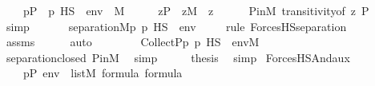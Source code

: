 \begin{isabellebody}
\ \ \ \ {\isachardoublequoteopen}{\isacharbraceleft}{\kern0pt}p{\isasymin}P\ {\isachardot}{\kern0pt}\ p\ {\isasymtturnstile}HS\ {\isasymphi}\ env{\isacharbraceright}{\kern0pt}\ {\isasymin}\ M{\isachardoublequoteclose}\isanewline
%
\isadelimproof
%
\endisadelimproof
%
\isatagproof
{}\isamarkupfalse%
\ {\isacharminus}{\kern0pt}\isanewline
\ \ \isamarkupfalse%
\ {\isachardoublequoteopen}z{\isasymin}P\ {\isasymLongrightarrow}\ z{\isasymin}M{\isachardoublequoteclose}\ \ z\isanewline
\ \ \ \ \isamarkupfalse%
\ P{\isacharunderscore}{\kern0pt}in{\isacharunderscore}{\kern0pt}M\ transitivity{\isacharbrackleft}{\kern0pt}of\ z\ P{\isacharbrackright}{\kern0pt}\ \isamarkupfalse%
\ simp\isanewline
\ \ \isamarkupfalse%
\isanewline
\ \ \isamarkupfalse%
\ {\isachardoublequoteopen}separation{\isacharparenleft}{\kern0pt}{\isacharhash}{\kern0pt}{\isacharhash}{\kern0pt}M{\isacharcomma}{\kern0pt}{\isasymlambda}p{\isachardot}{\kern0pt}\ {\isacharparenleft}{\kern0pt}p\ {\isasymtturnstile}HS\ {\isasymphi}\ env{\isacharparenright}{\kern0pt}{\isacharparenright}{\kern0pt}{\isachardoublequoteclose}\isanewline
\ \ \ \ \isamarkupfalse%
{\isacharparenleft}{\kern0pt}rule\ ForcesHS{\isacharunderscore}{\kern0pt}separation{\isacharparenright}{\kern0pt}\isanewline
\ \ \ \ \isamarkupfalse%
\ assms\isanewline
\ \ \ \ \isamarkupfalse%
\ auto\isanewline
\ \ \isamarkupfalse%
\ \isanewline
\ \ \isamarkupfalse%
\ {\isachardoublequoteopen}Collect{\isacharparenleft}{\kern0pt}P{\isacharcomma}{\kern0pt}{\isasymlambda}p{\isachardot}{\kern0pt}\ {\isacharparenleft}{\kern0pt}p\ {\isasymtturnstile}HS\ {\isasymphi}\ env{\isacharparenright}{\kern0pt}{\isacharparenright}{\kern0pt}{\isasymin}M{\isachardoublequoteclose}\isanewline
\ \ \ \ \isamarkupfalse%
\ separation{\isacharunderscore}{\kern0pt}closed\ P{\isacharunderscore}{\kern0pt}in{\isacharunderscore}{\kern0pt}M\ \isamarkupfalse%
\ simp\isanewline
\ \ \isamarkupfalse%
\ \isamarkupfalse%
\ {\isacharquery}{\kern0pt}thesis\ \isamarkupfalse%
\ simp\isanewline
{}\isamarkupfalse%
%
\endisatagproof
{\isafoldproof}%
%
\isadelimproof
\isanewline
%
\endisadelimproof
\isanewline
{}\isamarkupfalse%
\ ForcesHS{\isacharunderscore}{\kern0pt}And{\isacharunderscore}{\kern0pt}aux{\isacharcolon}{\kern0pt}\isanewline
\ \ \isanewline
\ \ \ \ {\isachardoublequoteopen}p{\isasymin}P{\isachardoublequoteclose}\ {\isachardoublequoteopen}env\ {\isasymin}\ list{\isacharparenleft}{\kern0pt}M{\isacharparenright}{\kern0pt}{\isachardoublequoteclose}\ {\isachardoublequoteopen}{\isasymphi}{\isasymin}formula{\isachardoublequoteclose}\ {\isachardoublequoteopen}{\isasympsi}{\isasymin}formula{\isachardoublequoteclose}\isanewline

\end{isabellebody}
